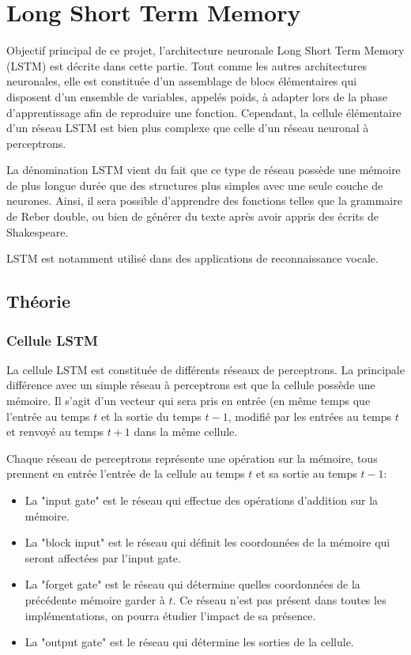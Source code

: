 
\chapter{Long Short Term Memory}

Objectif principal de ce projet, l'architecture neuronale Long Short Term Memory
(LSTM) est décrite dans cette partie. Tout comme les autres architectures
neuronales, elle est constituée d'un assemblage de blocs élémentaires qui
disposent d'un ensemble de variables, appelés poids, à adapter lors de la phase
d'apprentissage afin de reproduire une fonction. Cependant, la cellule
élémentaire d'un réseau LSTM est bien plus complexe que celle d'un réseau
neuronal à perceptrons.

\medskip

La dénomination LSTM vient du fait que ce type de réseau possède une mémoire de
plus longue durée que des structures plus simples avec une seule couche de
neurones. Ainsi, il sera possible d'apprendre des fonctions telles que la
grammaire de Reber double, ou bien de générer du texte après avoir appris des
écrits de Shakespeare.

\medskip

LSTM est notamment utilisé dans des applications de reconnaissance vocale.

\medskip

\section{Théorie}
\subsection{Cellule LSTM}

La cellule LSTM est constituée de différents réseaux de perceptrons.
La principale différence avec un simple réseau à perceptrons est que la cellule
possède une mémoire. Il s'agit d'un vecteur qui sera pris en entrée (en même
temps que l'entrée au temps $t$ et la sortie du temps $t-1$, modifié par
les entrées au temps $t$ et renvoyé au temps $t+1$ dans la même cellule.

\medskip

Chaque réseau de perceptrons représente une opération sur la mémoire, tous
prennent en entrée l'entrée de la cellule au temps $t$ et sa sortie au temps
$t-1$:

\begin{itemize}
  \item La "input gate" est le réseau qui effectue des opérations d'addition
    sur la mémoire.
  \item La "block input" est le réseau qui définit les coordonnées de la mémoire
    qui seront affectées par l'input gate.
  \item La "forget gate" est le réseau qui détermine quelles coordonnées de la
    précédente mémoire garder à $t$. Ce réseau n'est pas présent dans toutes les
    implémentations, on pourra étudier l'impact de sa présence.
  \item La "output gate" est le réseau qui détermine les sorties de la cellule.
\end{itemize}

